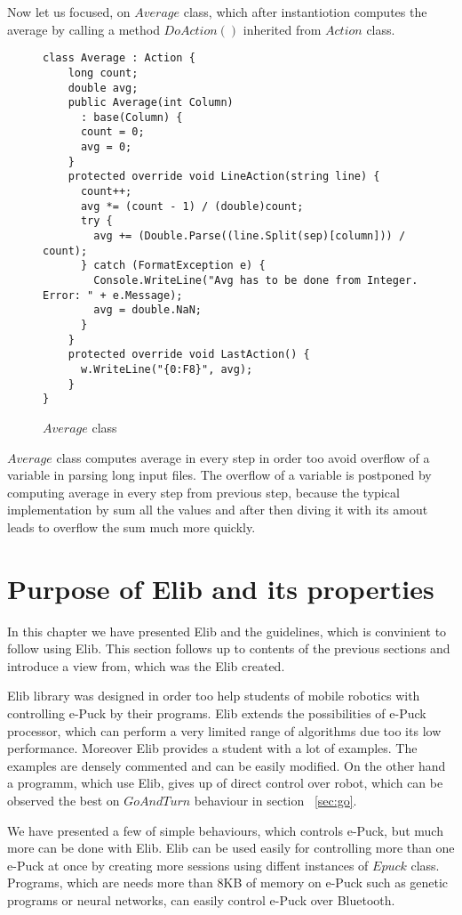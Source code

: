 	Now let us focused, on $Average$ class, which after instantiotion computes the average by calling a method $DoAction()$
	inherited from $Action$ class. 

\begin{figure}[!hbp]
\begin{lstlisting}
class Average : Action {
    long count;
    double avg;
    public Average(int Column)
      : base(Column) {
      count = 0;
      avg = 0;
    }
    protected override void LineAction(string line) {
      count++;
      avg *= (count - 1) / (double)count;
      try {
        avg += (Double.Parse((line.Split(sep)[column])) / count);
      } catch (FormatException e) {
        Console.WriteLine("Avg has to be done from Integer. Error: " + e.Message);
        avg = double.NaN;
      }
    }
    protected override void LastAction() {
      w.WriteLine("{0:F8}", avg);
    }
}
\end{lstlisting}
\caption{$Average$ class}\label{average}
\end{figure}

	$Average$ class computes average in every step in order too avoid overflow of a variable in parsing long input files. The overflow
	of a variable is postponed by computing average in every step from previous step, because the typical implementation
	by sum all the values and after then diving it with its amout leads to overflow the sum much more quickly.

\section{Purpose of Elib and its properties}
	In this chapter we have presented Elib and the guidelines, which is convinient to follow using Elib. 
	This section follows up to contents of the previous sections and introduce a view from,
	which was the Elib created.

	Elib library was designed in order too help students of mobile robotics	with controlling e-Puck by their programs.
	Elib extends the possibilities of e-Puck processor, which can perform a very limited range of algorithms
	due too its low performance.
	Moreover Elib provides a student with a lot of examples. The examples are densely commented
	and can be easily modified.
	On the other hand a programm, which use Elib, gives up of direct control over robot,
	which can be observed the best on $GoAndTurn$ behaviour in section ~\ref{sec:go}.

	We have presented a few of simple behaviours, which controls e-Puck, but much more can be done with Elib.
	Elib can be used easily for controlling more than one e-Puck at once by creating more sessions using
	diffent instances of $Epuck$ class. Programs, which are needs more than 8KB of memory on e-Puck such 
	as genetic programs or neural networks, can easily control e-Puck over Bluetooth.

